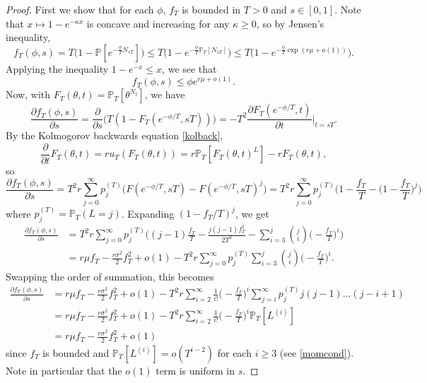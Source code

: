 \documentclass{article}
\theoremstyle{plain}
\theoremstyle{definition}
\renewcommand{\P}{\mathbb{P}}
\begin{document}
\begin{proof}
First we show that for each $\phi$, $f_T$ is bounded in $T>0$ and $s\in[0,1]$. Note that $x \mapsto 1 - e^{- \kappa x}$ is concave and increasing for any $\kappa\ge 0$, so by Jensen's inequality,
\[f_T(\phi,s) = T \big( 1 - \P[e^{- \frac{\phi}{T} N_{sT} } ]\big) \leq T \big( 1 - e^{- \frac{ \phi}{T} \P_T[N_{sT}]}\big) \leq T \big( 1 - e^{- \frac{ \phi}{T}\exp(r\mu + o(1))}\big).\]
Applying the inequality $1-e^{-x}\le x$, we see that
\[f_T(\phi,s) \le \phi e^{r\mu + o(1)}.\]
Now, with $F_T(\theta,t) = \P_T[\theta^{N_t}]$, we have
\begin{equation}\label{ftoF}
\frac{\partial f_T(\phi,s)}{\partial s} = \frac{\partial}{\partial s} \big(T(1-F_T(e^{-\phi/T},sT))\big) = -T^2 \frac{\partial F_T(e^{-\phi/T},t)}{\partial t}\Big|_{t=sT}.
\end{equation}
By the Kolmogorov backwards equation \eqref{kolback},
\begin{equation}\label{FtoUKol}
\frac{\partial}{\partial t}F_T(\theta,t) = ru_T(F_T(\theta,t)) = r\P_T[F_T(\theta,t)^L] - rF_T(\theta,t),
\end{equation}
so
\[\frac{\partial f_T(\phi,s)}{\partial s} = T^2 r \sum_{j=0}^\infty p_j^{(T)} \big( F(e^{-\phi/T},sT) - F(e^{-\phi/T},sT)^j\big) = T^2 r \sum_{j=0}^\infty p_j^{(T)} \Big( 1-\frac{f_T}{T} - \Big(1-\frac{f_T}{T}\Big)^j\Big)\]
where $p^{(T)}_j = \P_T(L=j)$. Expanding $(1-f_T/T)^j$, we get
\begin{align*}
\frac{\partial f_T(\phi,s)}{\partial s} &= T^2 r\sum_{j=0}^\infty p^{(T)}_j \bigg( (j-1) \frac{f_T}{T} - \frac{j(j-1)f_T^2}{2T^2} - \sum_{i=3}^j \binom{j}{i} \Big(-\frac{f_T}{T}\Big)^i \bigg)\\
&= r\mu f_T - \frac{r\sigma^2}{2} f_T^2 + o(1) -T^2 r \sum_{j=0}^\infty p^{(T)}_j \sum_{i=3}^j \binom{j}{i}\Big(-\frac{f_T}{T}\Big)^i.
\end{align*}
Swapping the order of summation, this becomes
\begin{align}
\frac{\partial f_T(\phi,s)}{\partial s} &= r\mu f_T - \frac{r\sigma^2}{2} f_T^2 + o(1) - T^2 r \sum_{i=2}^\infty \frac{1}{i!}\Big(-\frac{f_T}{T}\Big)^i \sum_{j=i}^\infty p_j^{(T)} j(j-1)\ldots (j-i+1)\nonumber\\
&= r\mu f_T - \frac{r\sigma^2}{2} f_T^2 + o(1) - T^2 r \sum_{i=2}^\infty \frac{1}{i!}\Big(-\frac{f_T}{T}\Big)^i \P_T[L^{(i)}]\nonumber\\
&= r\mu f_T - \frac{r\sigma^2}{2} f_T^2 + o(1)\label{partialfeqn}
\end{align}
since $f_T$ is bounded and $\P_T[L^{(i)}]=o(T^{i-2})$ for each $i\ge 3$ (see \eqref{momcond}). Note in particular that the $o(1)$ term is uniform in $s$.


\end{proof}
\end{document}
